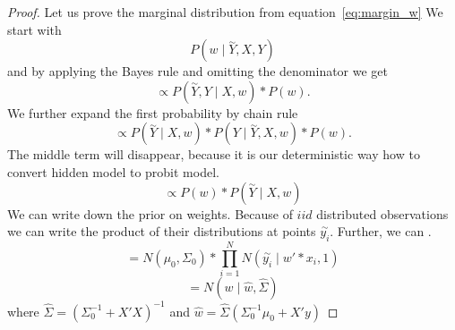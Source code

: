 \begin{proof}
Let us prove the marginal distribution from equation~\ref{eq:margin_w} 
We start with
\begin{equation}
    P(w \mid \overset{\sim}{Y}, X, Y) 
\end{equation}
and by applying the Bayes rule and omitting the denominator we get
\begin{equation}
    \propto   P(\overset{\sim}{Y}, Y \mid X, w) * P(w).
\end{equation}
We further expand the first probability by chain rule
\begin{equation}
    \propto   P(\overset{\sim}{Y} \mid X, w) * P(Y \mid \overset{\sim}{Y},  X, w) * P(w).
\end{equation}
The middle term will disappear, because it is our deterministic way how to convert hidden model to probit model.
\begin{equation}
    \propto   P(w) * P(\overset{\sim}{Y} \mid X, w)
\end{equation}
We can write down the prior on weights. Because of $iid$ distributed observations we can write the product of their distributions at points $\overset{\sim}{y_i}$. Further, we can .
\begin{equation}
    = N(\mu_0, \Sigma_0) * \prod_{i=1}^N N(\overset{\sim}{y_i} \mid w' * x_i, 1)
\end{equation}
\begin{equation}
    = N(w  \mid  \hat{w}, \hat{\Sigma})
\end{equation}
where $\hat{\Sigma} = (\Sigma_0^{-1} + X'X)^{-1}$ and $\hat{w} = \hat{\Sigma}(\Sigma_0^{-1}\mu_0 + X'y)$
\end{proof}

